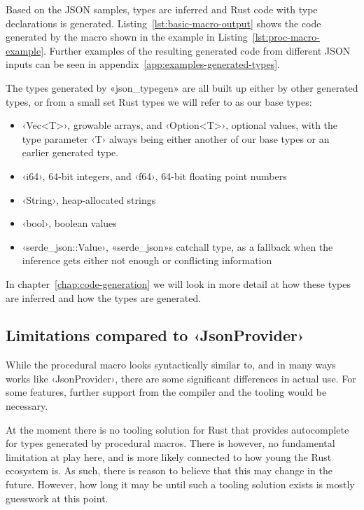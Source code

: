 Based on the JSON samples, types are inferred and Rust code with type declarations is generated. Listing~\ref{lst:basic-macro-output} shows the code generated by the macro shown in the example in Listing~\ref{lst:proc-macro-example}. Further examples of the resulting generated code from different JSON inputs can be seen in appendix~\ref{app:examples-generated-types}.

The types generated by «json_typegen» are all built up either by other generated types, or from a small set Rust types we will refer to as our base types:

\begin{itemize}
  \item ‹Vec<T>›, growable arrays, and ‹Option<T>›, optional values, with the type parameter ‹T› always being either another of our base types or an earlier generated type.
  \item ‹i64›, 64-bit integers, and ‹f64›, 64-bit floating point numbers
  \item ‹String›, heap-allocated strings
  \item ‹bool›, boolean values
  \item ‹serde_json::Value›, «serde_json»s catchall type, as a fallback when the inference gets either not enough or conflicting information
\end{itemize}

In chapter~\ref{chap:code-generation} we will look in more detail at how these types are inferred and how the types are generated.

\subsection{Limitations compared to ‹JsonProvider›}
\label{sec:macro-limitations}

While the procedural macro looks syntactically similar to, and in many ways works like ‹JsonProvider›, there are some significant differences in actual use. For some features, further support from the compiler and the tooling would be necessary.

At the moment there is no tooling solution for Rust that provides autocomplete for types generated by procedural macros. There is however, no fundamental limitation at play here, and is more likely connected to how young the Rust ecosystem is. As such, there is reason to believe that this may change in the future. However, how long it may be until such a tooling solution exists is mostly guesswork at this point.

